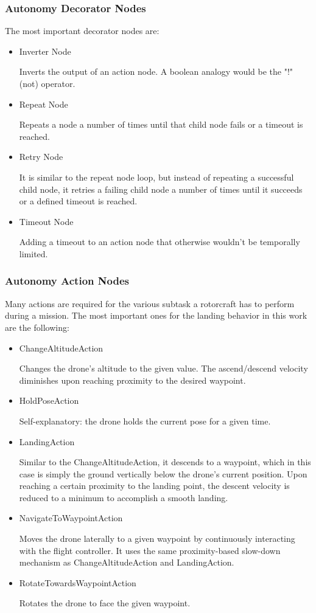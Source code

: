 \documentclass{article}
\begin{document}
\subsubsection{Autonomy Decorator Nodes}\label{subsubsec:decorator_nodes}

The most important decorator nodes are:

\begin{itemize}
    \item Inverter Node
    
    Inverts the output of an action node. A boolean analogy would be the "!" (not) operator.
    \item Repeat Node
    
    Repeats a node a number of times until that child node fails or a timeout is reached. 
    \item Retry Node
    
    It is similar to the repeat node loop, but instead of repeating a successful child node, it retries a failing child node a number of times until it succeeds or a defined timeout is reached.
    \item Timeout Node
    
    Adding a timeout to an action node that otherwise wouldn't be temporally limited.
\end{itemize}

\subsubsection{Autonomy Action Nodes}\label{subsubsec:setup:action_nodes}

Many actions are required for the various subtask a rotorcraft has to perform during a mission. The most important ones for the landing behavior in this work are the following:

\begin{itemize}
    \item ChangeAltitudeAction
    
    Changes the drone's altitude to the given value. The ascend/descend velocity diminishes upon reaching proximity to the desired waypoint.
    \item HoldPoseAction
    
    Self-explanatory: the drone holds the current pose for a given time.
    \item LandingAction
    
    Similar to the ChangeAltitudeAction, it descends to a waypoint, which in this case is simply the ground vertically below the drone's current position. Upon reaching a certain proximity to the landing point, the descent velocity is reduced to a minimum to accomplish a smooth landing.
    \item NavigateToWaypointAction
    
    Moves the drone laterally to a given waypoint by continuously interacting with the flight controller. It uses the same proximity-based slow-down mechanism as ChangeAltitudeAction and LandingAction.
    \item RotateTowardsWaypointAction
    
    Rotates the drone to face the given waypoint.
\end{itemize}
\end{document}

